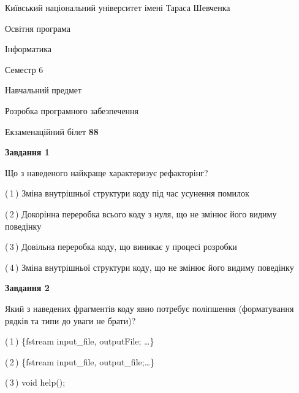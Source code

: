 \documentclass[10pt, ukrainian]{article}
\begin{document}
{{\begin {small}\par
{ \center  Київський національний університет імені Тараса Шевченка \par}
{\parbox {5 cm}{Освітня програма \hfill}{\parbox {7 cm}{Інформатика \hfill}}\parbox {6 cm}{\hfill Семестр 6}}\par
{\parbox {5 cm} {Навчальний предмет \hfill}\parbox {7 cm}{Розробка програмного забезпечення \hfill}\parbox {6cm}{\hfill}\par}\vspace{-7pt} \end{small}}{\center Екзаменаційний білет \No \textbf
{ 88 }\par}}
{
\begin {large}
{\begin {center}\textbf{Завдання 1}\end {center}}\par
Що з наведеного найкраще характеризує рефакторінг?\par
\vspace{2mm}



(\,1\,) Зміна внутрішньої структури коду під час усунення помилок%



(\,2\,) Докорінна переробка всього коду з нуля,  що не змінює його видиму поведінку%



(\,3\,) Довільна переробка коду, що виникає у процесі розробки%



(\,4\,) Зміна внутрішньої структури коду, що не змінює його видиму поведінку%


{\begin {center}\textbf{Завдання 2}\end {center}}\par
Який з наведених фрагментів коду явно потребує поліпшення (форматування рядків та типи до уваги не брати)?\par
\vspace{2mm}



(\,1\,) \{fstream input\_file, outputFile; …\}%



(\,2\,) \{fstream input\_file, output\_file;…\} %



(\,3\,) void help();%




\end{large}}
\end{document}
